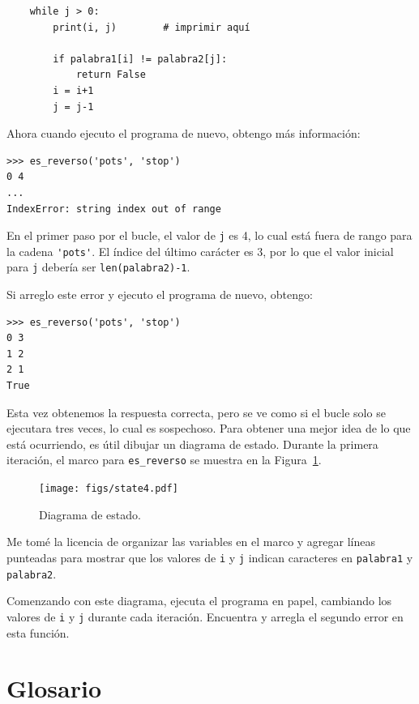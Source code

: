\documentclass[10pt]{book}
\begin{document}
\begin{verbatim}
    while j > 0:
        print(i, j)        # imprimir aquí

        if palabra1[i] != palabra2[j]:
            return False
        i = i+1
        j = j-1
\end{verbatim}
%
Ahora cuando ejecuto el programa de nuevo, obtengo más información:

\begin{verbatim}
>>> es_reverso('pots', 'stop')
0 4
...
IndexError: string index out of range
\end{verbatim}
%
En el primer paso por el bucle, el valor de {\tt j} es 4,
lo cual está fuera de rango para la cadena \verb"'pots'".
El índice del último carácter es 3, por lo que el
valor inicial para {\tt j} debería ser {\tt len(palabra2)-1}.

Si arreglo este error y ejecuto el programa de nuevo, obtengo:

\begin{verbatim}
>>> es_reverso('pots', 'stop')
0 3
1 2
2 1
True
\end{verbatim}
%
Esta vez obtenemos la respuesta correcta, pero se ve como si el bucle solo se ejecutara
tres veces, lo cual es sospechoso.  Para obtener una mejor idea de lo que está
ocurriendo, es útil dibujar un diagrama de estado.  Durante la primera
iteración, el marco para \verb"es_reverso" se muestra en la
Figura~\ref{fig.state4}.   

\begin{figure}
\centerline
{\texttt{[image: figs/state4.pdf]}}
\caption{Diagrama de estado.}
\label{fig.state4}
\end{figure}

Me tomé la licencia de organizar las variables en el marco
y agregar líneas punteadas para mostrar que los valores de {\tt i} y
{\tt j} indican caracteres en {\tt palabra1} y {\tt palabra2}.

Comenzando con este diagrama, ejecuta el programa en papel, cambiando los
valores de {\tt i} y {\tt j} durante cada iteración.  Encuentra y arregla el
segundo error en esta función.
\label{isreverse}


\section{Glosario}
\end{document}
